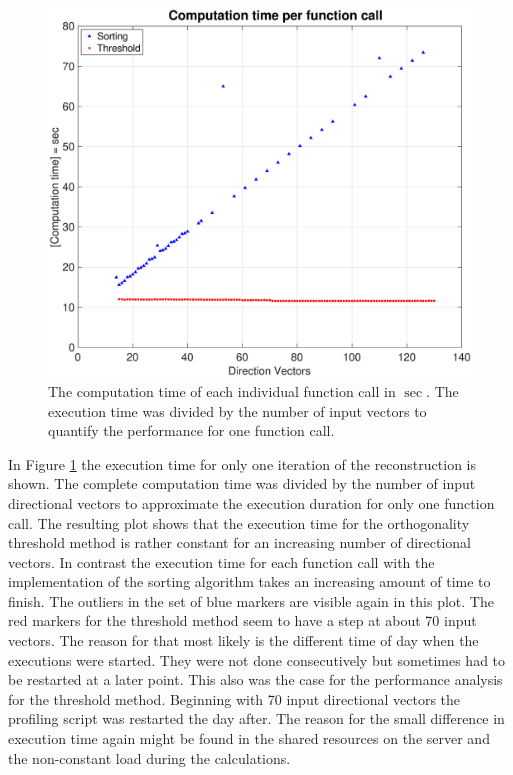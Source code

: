 \begin{figure}[H]
    \centering
    \includegraphics[width=1.08\textwidth]{Graphics/Results/computation_time_per_mexcall.eps}
    \caption{The computation time of each individual function call in $\sec$. The execution time was divided by the number of input vectors to quantify the performance for one function call.}
    \label{fig:computation_per_mex}
\end{figure}

In Figure \ref{fig:computation_per_mex} the execution time for only one iteration of the reconstruction is shown. The complete computation time was divided by the number of input directional vectors to approximate the execution duration for only one function call. The resulting plot shows that the execution time for the orthogonality threshold method is rather constant for an increasing number of directional vectors. In contrast the execution time for each function call with the implementation of the sorting algorithm takes an increasing amount of time to finish. The outliers in the set of blue markers are visible again in this plot. The red markers for the threshold method seem to have a step at about 70 input vectors. The reason for that most likely is the different time of day when the executions were started. They were not done consecutively but sometimes had to be restarted at a later point. This also was the case for the performance analysis for the threshold method. Beginning with 70 input directional vectors the profiling script was restarted the day after. The reason for the small difference in execution time again might be found in the shared resources on the server and the non-constant load during the calculations. 



